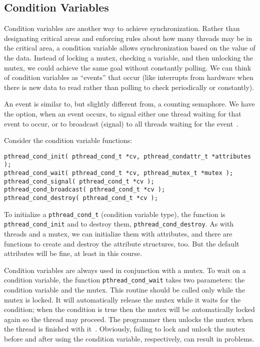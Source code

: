 




\subsection*{Condition Variables}
Condition variables are another way to achieve synchronization. Rather than designating critical areas and enforcing rules about how many threads may be in the critical area, a condition variable allows synchronization based on the value of the data. Instead of locking a mutex, checking a variable, and then unlocking the mutex, we could achieve the same goal without constantly polling. We can think of condition variables as ``events'' that occur (like interrupts from hardware when there is new data to read rather than polling to check periodically or constantly).

An event is similar to, but slightly different from, a counting semaphore. We have the option, when an event occurs, to signal either one thread waiting for that event to occur, or to broadcast (signal) to all threads waiting for the event~\cite{mte241}.

Consider the condition variable functions:

\begin{lstlisting}
pthread_cond_init( pthread_cond_t *cv, pthread_condattr_t *attributes );
pthread_cond_wait( pthread_cond_t *cv, pthread_mutex_t *mutex );
pthread_cond_signal( pthread_cond_t *cv );
pthread_cond_broadcast( pthread_cond_t *cv );
pthread_cond_destroy( pthread_cond_t *cv );
\end{lstlisting}

To initialize a \texttt{pthread\_cond\_t} (condition variable type), the function is \texttt{pthread\_cond\_init} and to destroy them, \texttt{pthread\_cond\_destroy}. As with threads and a mutex, we can initialize them with attributes, and there are functions to create and destroy the attribute structures, too. But the default attributes will be fine, at least in this course.

Condition variables are always used in conjunction with a mutex. To wait on a condition variable, the function \texttt{pthread\_cond\_wait} takes two parameters: the condition variable and the mutex. This routine should be called only while the mutex is locked. It will automatically release the mutex while it waits for the condition; when the condition is true then the mutex will be automatically locked again so the thread may proceed. The programmer then unlocks the mutex when the thread is finished with it~\cite{pthreads}. Obviously, failing to lock and unlock the mutex before and after using the condition variable, respectively, can result in problems.

